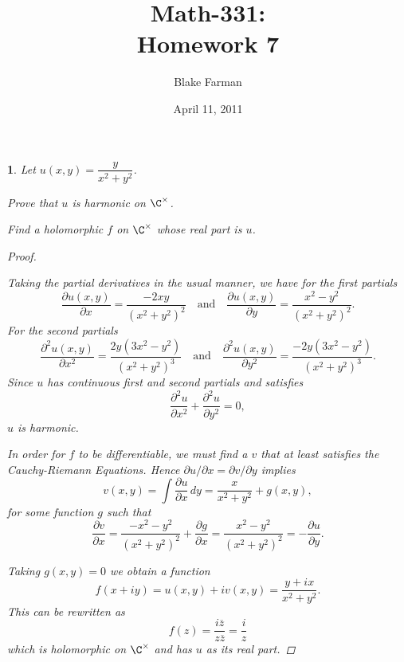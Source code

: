 \documentclass[10pt]{amsart}
\author{Blake Farman}
\title{Math-331:\\Homework 7}
\date{April 11, 2011}\pdfpagewidth 8.5in
\begin{document}
\maketitle

\newtheorem{thm}{}
\newtheorem{lem}{Lemma}[thm]
\newcommand{\D}{\mathbb{D}}
\newcommand{\HH}{\mathcal{H}}
\begin{thm}
  \label{Ex1}
  Let $u(x,y) = \dfrac{y}{x^2+y^2}$.

  \begin{alphaenum}
  \item
    Prove that $u$ is harmonic on $\C^{\times}$.
  \item
    Find a holomorphic $f$ on $\C^{\times}$ whose real part is $u$.
  \end{alphaenum}
  
  \begin{proof}
    \begin{alphaenum}
    \item
      Taking the partial derivatives in the usual manner, we have for the first partials
      $$\frac{\partial u(x,y)}{\partial x} =  \frac{-2xy}{(x^2+y^2)^2} \quad \text{and} \quad \frac{\partial u(x,y)}{\partial y} = \frac{x^2 - y^2}{(x^2 + y^2)^2}.$$
      For the second partials
      $$\frac{\partial^2 u(x,y)}{\partial x^2} =  \frac{2y(3x^2 - y^2)}{(x^2+y^2)^3} \quad \text{and} \quad \frac{\partial^2 u(x,y)}{\partial y^2} = \frac{-2y(3x^2 - y^2)}{(x^2 + y^2)^3}.$$
      Since $u$ has continuous first and second partials and satisfies $$\frac{\partial^2 u}{\partial x^2} + \frac{\partial^2 u}{\partial y^2} = 0,$$
      $u$ is harmonic.
    \item
      In order for $f$ to be differentiable, we must find a $v$ that at least satisfies the Cauchy-Riemann Equations.
      Hence $\partial u/\partial x = \partial v/\partial y$ implies
      $$v(x,y) = \int \frac{\partial u}{\partial x}\,dy = \frac{x}{x^2 + y^2}  + g(x,y),$$
      for some function $g$ such that 
      $$\frac{\partial v}{\partial x} = \frac{-x^2 - y^2}{(x^2 + y^2)^2} + \frac{\partial g}{\partial x}  =  \frac{x^2 - y^2}{(x^2 + y^2)^2} = -\frac{\partial u}{\partial y}.$$
    \end{alphaenum}
    Taking $g(x,y) = 0$ we obtain a function $$f(x+iy) = u(x,y) + iv(x,y) = \frac{y + ix}{x^2 + y^2}.$$
    This can be rewritten as 
    $$f(z) = \frac{i\overline{z}}{z\overline{z}} = \frac{i}{z}$$
    which is holomorphic on $\C^{\times}$ and has $u$ as its real part.
  \end{proof}
\end{thm}
\end{document}
